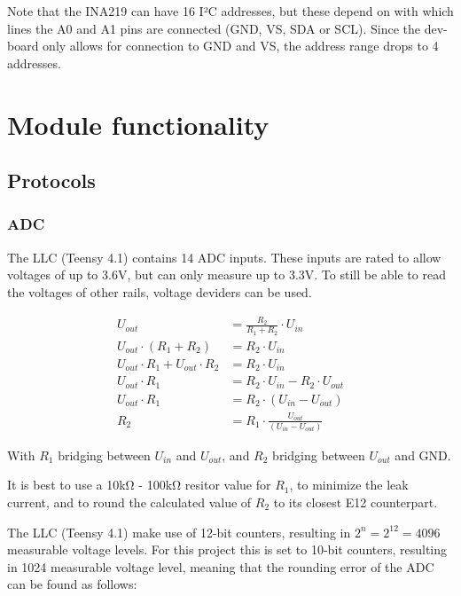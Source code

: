 \documentclass[ti,oneside,10pt]{uantwerpenreport}
\begin{document}
Note that the INA219 can have 16 I²C addresses, but these depend on with which lines the A0 and A1 pins are connected (GND, VS, SDA or SCL).
Since the dev-board only allows for connection to GND and VS, the address range drops to 4 addresses.

\chapter{Module functionality}      %
\section{Protocols}
\subsection{ADC}
The LLC (Teensy 4.1) contains 14 ADC inputs.
These inputs are rated to allow voltages of up to 3.6V, but can only measure up to 3.3V.
To still be able to read the voltages of other rails, voltage deviders can be used.

\vspace{-18pt}
\begin{align}
    U_{out}                                   & = \frac{R_{2}}{R_{1} + R_{2}} \cdot U_{in} \\
    U_{out} \cdot (R_{1} + R_{2})             & = R_{2} \cdot U_{in} \\
    U_{out} \cdot R_{1} + U_{out} \cdot R_{2} & = R_{2} \cdot U_{in} \\
    U_{out} \cdot R_{1}                       & = R_{2} \cdot U_{in} - R_{2} \cdot U_{out} \\
    U_{out} \cdot R_{1}                       & = R_{2} \cdot (U_{in} - U_{out}) \\
    R_{2}                                     & = R_{1} \cdot \frac{U_{out}}{(U_{in} - U_{out})}
\end{align}
\vspace{-6pt}

With $R_{1}$ bridging between $U_{in}$ and $U_{out}$, and $R_{2}$ bridging between $U_{out}$ and GND.

It is best to use a 10kΩ - 100kΩ resitor value for $R_{1}$, to minimize the leak current, and to round the calculated value of $R_{2}$ to its closest E12 counterpart.

The LLC (Teensy 4.1) make use of 12-bit counters, resulting in $2^{n} = 2^{12} = 4096$ measurable voltage levels.
For this project this is set to 10-bit counters, resulting in 1024 measurable voltage level, meaning that the rounding error of the ADC can be found as follows:
\end{document}
